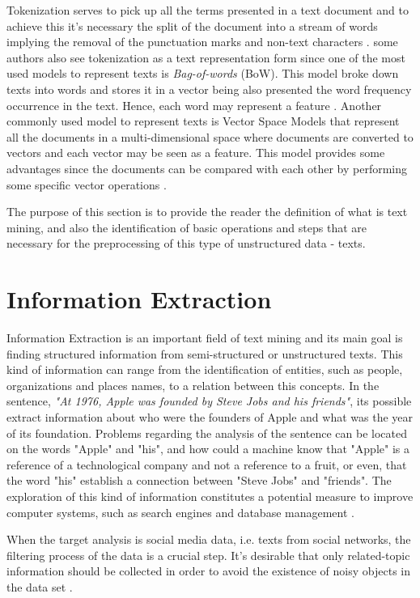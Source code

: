 Tokenization serves to pick up all the terms presented in a text document and to achieve this it's necessary the split of the document into a stream of words implying the removal of the punctuation marks and non-text characters \cite{kn:Hotho2005}. some authors also see tokenization as a text representation form since one of the most used models to represent texts is \textit{Bag-of-words} (BoW). This model broke down texts into words and stores it in a vector being also presented the word frequency occurrence in the text. Hence, each word may represent a feature \cite{kn:Sriram2010}. Another commonly used model to represent texts is Vector Space Models that represent all the documents in a multi-dimensional space where documents are converted to vectors and each vector may be seen as a feature. This model provides some advantages since the documents can be compared with each other by performing some specific vector operations \cite{kn:Hotho2005}.

The purpose of this section is to provide the reader the definition of what is text mining, and also the identification of basic operations and steps that are necessary for the preprocessing of this type of unstructured data - texts.

\section{Information Extraction}
Information Extraction is an important field of text mining and its main goal is finding structured information from semi-structured or unstructured texts. This kind of information can range from the identification of entities, such as people, organizations and places names, to a relation between this concepts. In the sentence, \textit{"At 1976, Apple was founded by Steve Jobs and his friends"}, its possible extract information about who were the founders of Apple and what was the year of its foundation. Problems regarding the analysis of the sentence can be located on the words "Apple" and "his", and how could a machine know that "Apple" is a reference of a technological company and not a reference to a fruit, or even, that the word "his" establish a connection between "Steve Jobs" and "friends". The exploration of this kind of information constitutes a potential measure to improve computer systems, such as search engines and database management \cite{kn:Aggarwal2012}.

When the target analysis is social media data, i.e. texts from social networks, the filtering process of the data is a crucial step. It's desirable that only related-topic information should be collected in order to avoid the existence of noisy objects in the data set \cite{kn:Cecilia2016, kn:Saleiro2013}.

